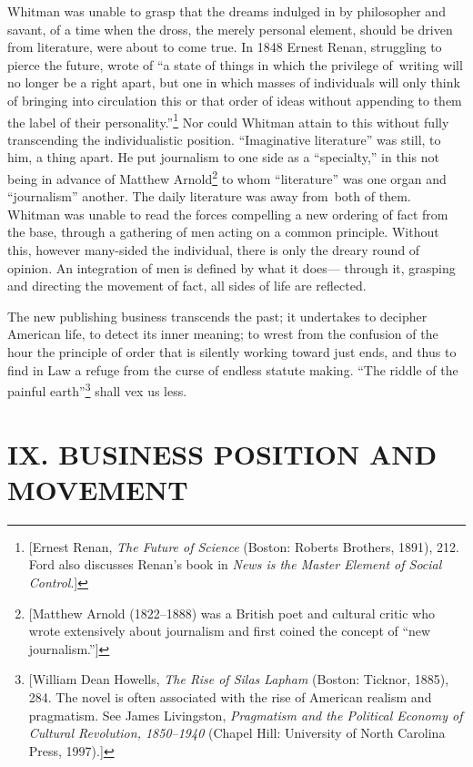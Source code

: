 \documentclass[openany,nobib]{tufte-book}
\begin{document}
Whitman was unable to grasp that the dreams indulged in by philosopher
and savant, of a time when the dross, the merely personal element,
should be driven from literature, were about to come true. In 1848
Ernest Renan, struggling to pierce the future, wrote of ``a state of
things in which the privilege of~writing will no longer be a right
apart, but one in which masses of individuals will only think of
bringing into circulation this or that order of ideas without appending
to them the label of their personality.''\footnote{{[}Ernest Renan,
  \emph{The Future of Science} (Boston: Roberts Brothers, 1891), 212.
  Ford also discusses Renan's book in \emph{News is the Master Element
  of Social Control}.{]}} Nor could Whitman attain to this without fully
transcending the individualistic position. ``Imaginative literature''
was still, to him, a thing apart. He put journalism to one side as a
``specialty,'' in this not being in advance of Matthew Arnold\footnote{{[}Matthew
  Arnold (1822--1888) was a British poet and cultural critic who wrote
  extensively about journalism and first coined the concept of ``new
  journalism.''{]}} to whom ``literature'' was one organ and
``journalism'' another. The daily literature was away from~both of them.
Whitman was unable to read the forces compelling a new ordering of fact
from the base, through a gathering of men acting on a common principle.
Without this, however many-sided the individual, there is only the
dreary round of opinion. An integration of men is defined by what it
does--- through it, grasping and directing the movement of fact, all
sides of life are reflected.~

The new publishing business transcends the past; it undertakes to
decipher American life, to detect its inner meaning; to wrest from the
confusion of the hour the principle of order that is silently working
toward just ends, and thus to find in Law a refuge from the curse of
endless statute making. ``The riddle of the painful earth''\footnote{{[}William
  Dean Howells, \emph{The Rise of Silas Lapham} (Boston: Ticknor, 1885),
  284. The novel is often associated with the rise of American realism
  and pragmatism. See James Livingston, \emph{Pragmatism and the
  Political Economy of Cultural Revolution, 1850--1940} (Chapel Hill:
  University of North Carolina Press, 1997).{]}} shall vex us less.~

\hypertarget{ix-business-position-and-movement}{%
\section{IX. BUSINESS POSITION AND
MOVEMENT}\label{ix-business-position-and-movement}}
\end{document}
